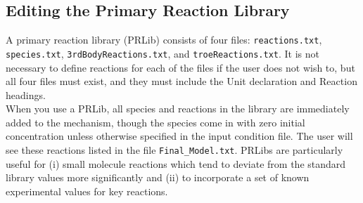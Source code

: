 \documentclass[12pt,letterpaper]{article}
\begin{document}
\subsection{Editing the Primary Reaction Library}

A primary reaction library (PRLib) consists of four files: \texttt{reactions.txt}, \texttt{species.txt},
\texttt{3rdBodyReactions.txt}, and \texttt{troeReactions.txt}. It is not necessary to define reactions
for each of the files if the user does not wish to, but all four files must
exist, and they must include the Unit declaration and Reaction headings.\\

When you use a PRLib, all species and reactions in the library are immediately
added to the mechanism, though the species come in with zero
initial concentration unless otherwise specified in the input condition file.
The user will see these reactions listed in the file \texttt{Final\_Model.txt}. PRLibs
are particularly useful for (i) small molecule reactions which tend to deviate
from the standard library values more significantly and (ii) to incorporate a
set of known experimental values for key reactions.\\
\end{document}
